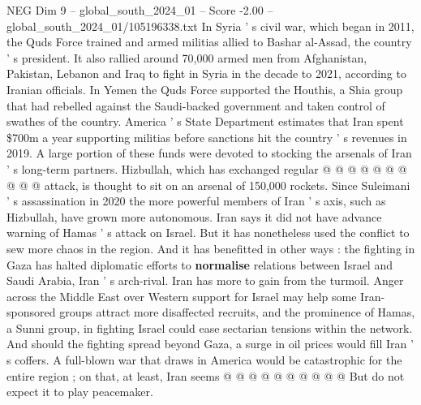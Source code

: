 \begin{textsample}{NEG Dim 9 – global\_south\_2024\_01 – Score -2.00 – global\_south\_2024\_01/105196338.txt}
In Syria ' s civil war, which began in 2011, the Quds Force trained and armed militias allied to Bashar al-Assad, the country ' s president.
It also rallied around 70,000 armed men from Afghanistan, Pakistan, Lebanon and Iraq to fight in Syria in the decade to 2021, according to Iranian officials.
In Yemen the Quds Force supported the Houthis, a Shia group that had rebelled against the Saudi-backed government and taken control of swathes of the country.
America ' s State Department estimates that Iran spent \$700m a year supporting militias before sanctions hit the country ' s revenues in 2019.
A large portion of these funds were devoted to stocking the arsenals of Iran ' s long-term partners.
Hizbullah, which has exchanged regular @ @ @ @ @ @ @ @ @ @ attack, is thought to sit on an arsenal of 150,000 rockets.
Since Suleimani ' s assassination in 2020 the more powerful members of Iran ' s axis, such as Hizbullah, have grown more autonomous.
Iran says it did not have advance warning of Hamas ' s attack on Israel.
But it has nonetheless used the conflict to sew more chaos in the region.
And it has benefitted in other ways : the fighting in Gaza has halted diplomatic efforts to \textbf{normalise} relations between Israel and Saudi Arabia, Iran ' s arch-rival.
Iran has more to gain from the turmoil.
Anger across the Middle East over Western support for Israel may help some Iran-sponsored groups attract more disaffected recruits, and the prominence of Hamas, a Sunni group, in fighting Israel could ease sectarian tensions within the network.
And should the fighting spread beyond Gaza, a surge in oil prices would fill Iran ' s coffers.
A full-blown war that draws in America would be catastrophic for the entire region ; on that, at least, Iran seems @ @ @ @ @ @ @ @ @ @ But do not expect it to play peacemaker.

\end{textsample}
